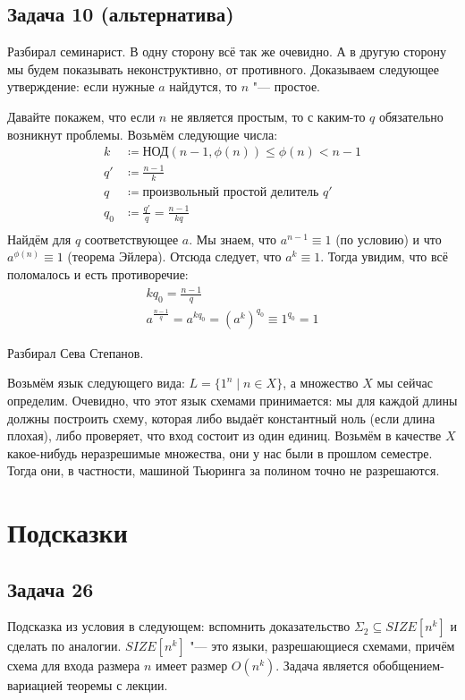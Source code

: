 \subsection{Задача 10 (альтернатива)}
	Разбирал семинарист.
	В одну сторону всё так же очевидно.
	А в другую сторону мы будем показывать неконструктивно, от противного.
	Доказываем следующее утверждение: если нужные $a$ найдутся, то $n$ "--- простое.

	Давайте покажем, что если $n$ не является простым, то с каким-то $q$ обязательно возникнут проблемы.
	Возьмём следующие числа:
	\begin{align*}
		k &\coloneq \textrm{НОД}(n-1, \phi(n)) \le \phi(n) < n - 1 \\
		q' &\coloneq \frac{n-1}{k} \\
		q &\coloneq \text{произвольный простой делитель $q'$} \\
		q_0 &\coloneq \frac{q'}{q} = \frac{n-1}{kq} \\
	\end{align*}
	Найдём для $q$ соответствующее $a$.
	Мы знаем, что $a^{n-1} \equiv 1$ (по условию) и что $a^{\phi(n)} \equiv 1$ (теорема Эйлера).
	Отсюда следует, что $a^k \equiv 1$.
	Тогда увидим, что всё поломалось и есть противоречие:
	\begin{gather*}
		kq_0 = \frac{n-1}q \\
		a^{\frac{n-1}{q}} = a^{kq_0} = (a^k)^{q_0} \equiv 1^{q_0} = 1
	\end{gather*}

	Разбирал Сева Степанов.

	Возьмём язык следующего вида: $L = \{1^n \mid n \in X\}$, а множество
	$X$ мы сейчас определим.
	Очевидно, что этот язык схемами принимается: мы для каждой длины должны построить схему,
	которая либо выдаёт константный ноль (если длина плохая), либо проверяет, что вход состоит
	из один единиц.
	Возьмём в качестве $X$ какое-нибудь неразрешимые множества, они у нас были в прошлом семестре.
	Тогда они, в частности, машиной Тьюринга за полином точно не разрешаются.

\section{Подсказки}
\subsection{Задача 26}
	Подсказка из условия в следующем: вспомнить доказательство $\Sigma_2 \subseteq SIZE[n^k]$
	и сделать по аналогии.
	$SIZE[n^k]$ "--- это языки, разрешающиеся схемами, причём схема для входа размера $n$ имеет размер $O(n^k)$.
	Задача является обобщением-вариацией теоремы с лекции.

